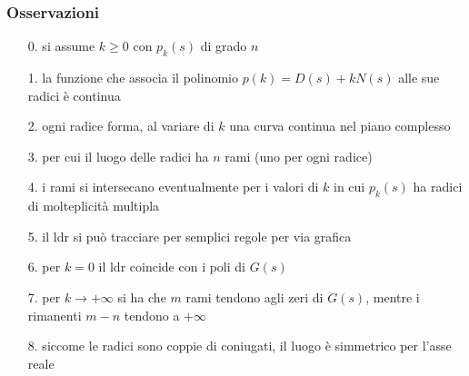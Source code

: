 \subsubsection*{Osservazioni}
\begin{itemize}
	\item[0.] si assume \(k \geq 0\) con \(p_k(s)\) di grado \(n\)
	\item[1.] la funzione che associa il polinomio \(p(k) = D(s) +kN(s)\) alle sue radici è continua
	\item[2.] ogni radice forma, al variare di \(k\) una curva continua nel piano complesso
	\item[3.] per cui il luogo delle radici ha \(n\) rami (uno per ogni radice)
	\item[4.] i rami si intersecano eventualmente per i valori di \(k\) in cui \(p_k(s)\) ha radici di molteplicità multipla
	\item[5.] il ldr si può tracciare per semplici regole per via grafica
	\item[6.] per \(k=0\) il ldr coincide con i poli di \(G(s)\)
	\item[7.] per \(k \to +\infty\) si ha che \(m\) rami tendono agli zeri di \(G(s)\), mentre i rimanenti \(m-n\) tendono a \(+\infty\)
	\item[8.] siccome le radici sono coppie di coniugati, il luogo è simmetrico per l'asse reale
\end{itemize}

